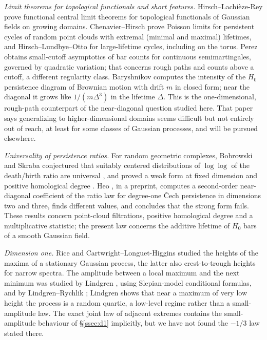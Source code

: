 \emph{Limit theorems for topological functionals and short features.} Hirsch--Lachièze-Rey \cite{HirschLR} prove functional central limit theorems for topological functionals of Gaussian fields on growing domains. Chenavier--Hirsch \cite{ChenavierHirsch} prove Poisson limits for persistent cycles of random point clouds with extremal (minimal and maximal) lifetimes, and Hirsch--Lundbye--Otto \cite{HLO} for large-lifetime cycles, including on the torus. Perez \cite{Perez} obtains small-cutoff asymptotics of bar counts for continuous semimartingales, governed by quadratic variation; that concerns rough paths and counts above a cutoff, a different regularity class. Baryshnikov \cite{Baryshnikov2025} computes the intensity of the $H_0$ persistence diagram of Brownian motion with drift $m$ in closed form; near the diagonal it grows like $1/(m\Delta^3)$ in the lifetime $\Delta$. This is the one-dimensional, rough-path counterpart of the near-diagonal question studied here. That paper says generalizing to higher-dimensional domains seems difficult but not entirely out of reach, at least for some classes of Gaussian processes, and will be pursued elsewhere.

\emph{Universality of persistence ratios.} For random geometric complexes, Bobrowski and Skraba conjectured that suitably centered distributions of $\log\log$ of the death/birth ratio are universal \cite{BobrowskiSkraba2023}, and proved a weak form at fixed dimension and positive homological degree \cite{BobrowskiSkraba2024}. Heo \cite{Heo2026}, in a preprint, computes a second-order near-diagonal coefficient of the ratio law for degree-one \v{C}ech persistence in dimensions two and three, finds different values, and concludes that the strong form fails. These results concern point-cloud filtrations, positive homological degree and a multiplicative statistic; the present law concerns the additive lifetime of $H_0$ bars of a smooth Gaussian field.

\emph{Dimension one.} Rice \cite{Rice} and Cartwright--Longuet-Higgins \cite{CLH} studied the heights of the maxima of a stationary Gaussian process, the latter also crest-to-trough heights for narrow spectra. The amplitude between a local maximum and the next minimum was studied by Lindgren \cite{Lindgren1972}, using Slepian-model conditional formulas, and by Lindgren--Rychlik \cite{LindgrenRychlik}; Lindgren \cite{Lindgren1970} shows that near a maximum of very low height the process is a random quartic, a low-level regime rather than a small-amplitude law. The exact joint law of adjacent extremes \cite{Lindgren2019} contains the small-amplitude behaviour of \S\ref{ssec:d1} implicitly, but we have not found the $-1/3$ law stated there.

